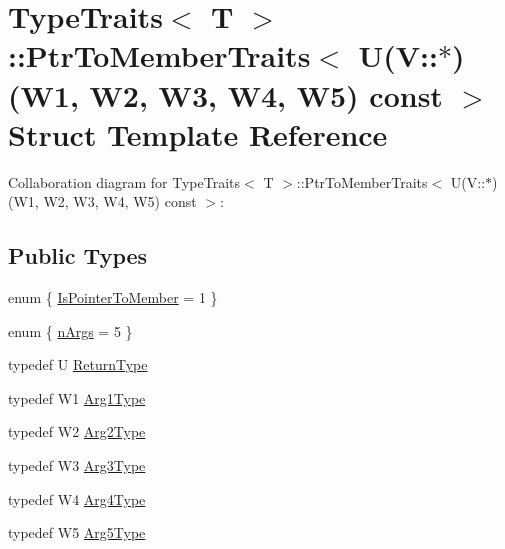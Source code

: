\hypertarget{structTypeTraits_1_1PtrToMemberTraits_3_01U_07V_1_1_5_08_07W1_00_01W2_00_01W3_00_01W4_00_01W5_08_01const_01_01_4}{}\section{Type\+Traits$<$ T $>$\+:\+:Ptr\+To\+Member\+Traits$<$ U(V\+:\+:$\ast$)(W1, W2, W3, W4, W5) const $>$ Struct Template Reference}
\label{structTypeTraits_1_1PtrToMemberTraits_3_01U_07V_1_1_5_08_07W1_00_01W2_00_01W3_00_01W4_00_01W5_08_01const_01_01_4}


Collaboration diagram for Type\+Traits$<$ T $>$\+:\+:Ptr\+To\+Member\+Traits$<$ U(V\+:\+:$\ast$)(W1, W2, W3, W4, W5) const $>$\+:
\subsection*{Public Types}
\begin{DoxyCompactItemize}
\item 
enum \{ \hyperlink{structTypeTraits_1_1PtrToMemberTraits_3_01U_07V_1_1_5_08_07W1_00_01W2_00_01W3_00_01W4_00_01W5_08_01const_01_01_4_ada4472b28e07af5b54f0c9a889e897b0a8c670eaa60b89c4b35c271e669acd393}{Is\+Pointer\+To\+Member} = 1
 \}
\item 
enum \{ \hyperlink{structTypeTraits_1_1PtrToMemberTraits_3_01U_07V_1_1_5_08_07W1_00_01W2_00_01W3_00_01W4_00_01W5_08_01const_01_01_4_a2aeb341dc046c29bbf9d1707b050a0ada90166c7045bdd19eacc875e6237710fd}{n\+Args} = 5
 \}
\item 
typedef U \hyperlink{structTypeTraits_1_1PtrToMemberTraits_3_01U_07V_1_1_5_08_07W1_00_01W2_00_01W3_00_01W4_00_01W5_08_01const_01_01_4_a160b7346ccea3332d40fd493350587a5}{Return\+Type}
\item 
typedef W1 \hyperlink{structTypeTraits_1_1PtrToMemberTraits_3_01U_07V_1_1_5_08_07W1_00_01W2_00_01W3_00_01W4_00_01W5_08_01const_01_01_4_a71a4bd265aaa5993940204ececa6af4b}{Arg1\+Type}
\item 
typedef W2 \hyperlink{structTypeTraits_1_1PtrToMemberTraits_3_01U_07V_1_1_5_08_07W1_00_01W2_00_01W3_00_01W4_00_01W5_08_01const_01_01_4_aa632953479e4f4c3c1e1707d5b820228}{Arg2\+Type}
\item 
typedef W3 \hyperlink{structTypeTraits_1_1PtrToMemberTraits_3_01U_07V_1_1_5_08_07W1_00_01W2_00_01W3_00_01W4_00_01W5_08_01const_01_01_4_a60c17652a268700d6a5b1411d1d7f03f}{Arg3\+Type}
\item 
typedef W4 \hyperlink{structTypeTraits_1_1PtrToMemberTraits_3_01U_07V_1_1_5_08_07W1_00_01W2_00_01W3_00_01W4_00_01W5_08_01const_01_01_4_a5b658692abebbf4653cce207ef59850a}{Arg4\+Type}
\item 
typedef W5 \hyperlink{structTypeTraits_1_1PtrToMemberTraits_3_01U_07V_1_1_5_08_07W1_00_01W2_00_01W3_00_01W4_00_01W5_08_01const_01_01_4_a2d82f5efcbdcd11214e2ee7f3e8e5da4}{Arg5\+Type}
\end{DoxyCompactItemize}


